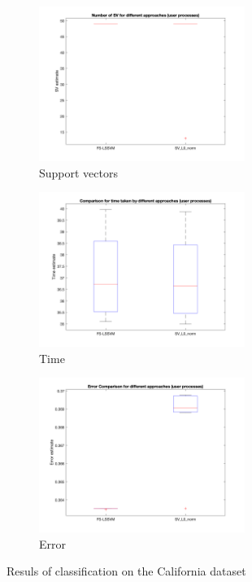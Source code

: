 \documentclass[a4paper, 11pt, one column]{article}
\begin{document}
\begin{figure}[H]
    \begin{subfigure}{0.33\textwidth}
        \includegraphics[width=6.7cm]{images/k=5_SV.png}
        \caption{Support vectors}
        \label{fig:4}
    \end{subfigure}\hfil %
    \begin{subfigure}{0.33\textwidth}
        \includegraphics[width=6.7cm]{images/k=5_time.png}
        \caption{Time}
        \label{fig:5}
    \end{subfigure}\hfil %
    \begin{subfigure}{0.33\textwidth}
        \includegraphics[width=6.7cm]{images/k=5_error.png}
        \caption{Error}
        \label{fig:5}
    \end{subfigure}\hfil %
    \caption{Resuls of classification on the California dataset}
    \label{fig:calihomework}
\end{figure}

\clearpage

\printbibliography
\end{document}
